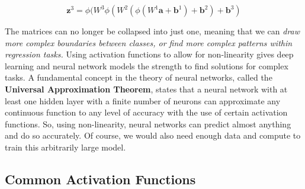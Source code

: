 \begin{flushleft}
    $$\textbf{z}^3 = \phi(W^3\phi(W^2(\phi(W^1\textbf{a} + \textbf{b}^1) + \textbf{b}^2) + \textbf{b}^3)$$

    The matrices can no longer be collapsed into just one, meaning that we can \textit{draw more complex boundaries between classes, or find more complex patterns within regression tasks.} Using activation functions to allow for non-linearity gives deep learning and neural network models the strength to find solutions for complex tasks. A fundamental concept in the theory of neural networks, called the \textbf{Universal Approximation Theorem}, states that a neural network with at least one hidden layer with a finite number of neurons can approximate any continuous function to any level of accuracy with the use of certain activation functions. So, using non-linearity, neural networks can predict almost anything and do so accurately. Of course, we would also need enough data and compute to train this arbitrarily large model. \break
\end{flushleft}
\subsection{Common Activation Functions}

